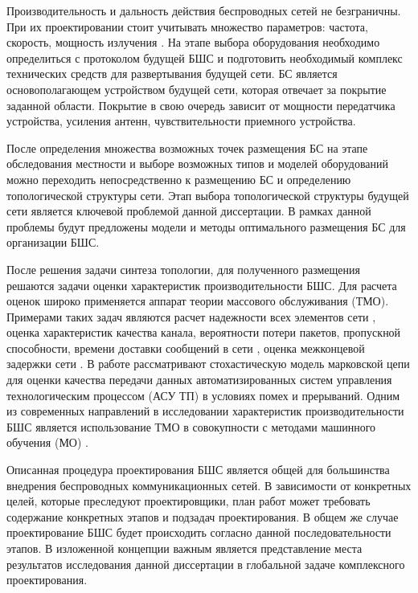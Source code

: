 Производительность и дальность действия беспроводных сетей не безграничны. При их проектировании стоит учитывать множество параметров: частота, скорость, мощность излучения \cite{Proletarsky}. На этапе выбора оборудования необходимо определиться с протоколом будущей БШС и  подготовить необходимый комплекс технических средств для развертывания будущей сети. БС является основополагающем устройством будущей сети, которая отвечает за покрытие заданной области. Покрытие в свою очередь зависит от мощности передатчика устройства, усиления антенн, чувствительности приемного устройства.


После определения множества возможных точек размещения БС на этапе обследования местности и выборе возможных типов и моделей оборудований можно переходить непосредственно к размещению БС и определению топологической структуры сети. Этап выбора топологической структуры будущей сети является ключевой проблемой данной диссертации. В рамках данной проблемы будут предложены модели и методы оптимального размещения БС для организации БШС.

После решения задачи синтеза топологии, для полученного размещения решаются задачи оценки характеристик производительности БШС. Для расчета оценок широко применяется аппарат теории массового обслуживания (ТМО). Примерами таких задач являются расчет надежности всех элементов сети \cite{Wankpo2020, Krishnamoorthy2021, Kozyrev2019}, оценка характеристик качества канала, вероятности потери пакетов, пропускной способности, времени доставки сообщений в сети \cite{Gorbunova2020, Larionov2019, Vishnevsky2016_Methods_of_performance, Vishnevsky2016_Review_of_methodology, Wang2017, Sandmann2012, Baumann2017}, оценка межконцевой задержки сети \cite{Wang2017, Sandmann2012}. В работе \cite{Eremenko2013} рассматривают стохастическую модель марковской цепи для оценки качества передачи данных автоматизированных систем управления технологическим процессом (АСУ ТП) в условиях помех и прерываний. Одним из современных направлений в исследовании характеристик производительности БШС является использование ТМО в совокупности с методами машинного обучения (МО) \cite{Lovas2021, SatyaHermanto2018}.

Описанная процедура проектирования БШС является общей для большинства внедрения беспроводных коммуникационных сетей. В зависимости от конкретных целей, которые преследуют проектировщики, план работ может требовать содержание конкретных этапов и подзадач проектирования. В общем же случае проектирование БШС будет происходить согласно данной последовательности этапов. В изложенной концепции важным является представление места результатов исследования данной диссертации в глобальной задаче комплексного проектирования.


